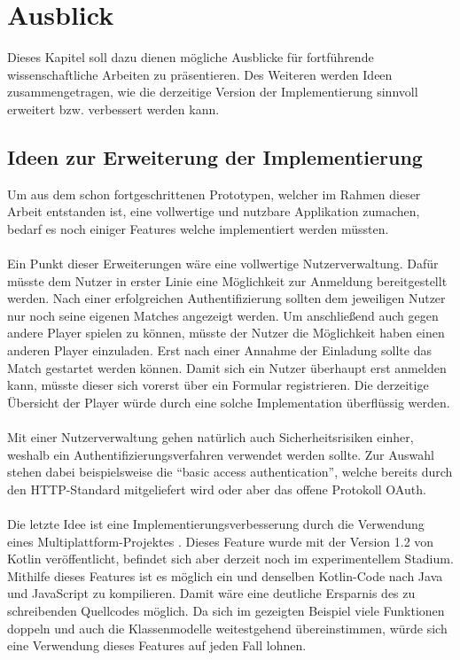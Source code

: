 
\chapter{Ausblick}\label{chap:outlook}
Dieses Kapitel soll dazu dienen mögliche Ausblicke für fortführende wissenschaftliche Arbeiten zu präsentieren. Des Weiteren werden Ideen zusammengetragen, wie die derzeitige Version der Implementierung sinnvoll erweitert bzw. verbessert werden kann.

\section{Ideen zur Erweiterung der Implementierung}
Um aus dem schon fortgeschrittenen Prototypen, welcher im Rahmen dieser Arbeit entstanden ist, eine vollwertige und nutzbare Applikation zumachen, bedarf es noch einiger Features welche implementiert werden müssten.\\
\\
Ein Punkt dieser Erweiterungen wäre eine vollwertige Nutzerverwaltung. Dafür müsste dem Nutzer in erster Linie eine Möglichkeit zur Anmeldung bereitgestellt werden. Nach einer erfolgreichen Authentifizierung sollten dem jeweiligen Nutzer nur noch seine eigenen Matches angezeigt werden.
Um anschließend auch gegen andere Player spielen zu können, müsste der Nutzer die Möglichkeit haben einen anderen Player einzuladen. Erst nach einer Annahme der Einladung sollte das Match gestartet werden können. Damit sich ein Nutzer überhaupt erst anmelden kann, müsste dieser sich vorerst über ein Formular registrieren. Die derzeitige Übersicht der Player würde durch eine solche Implementation überflüssig werden.\\
\\
Mit einer Nutzerverwaltung gehen natürlich auch Sicherheitsrisiken einher, weshalb ein Authentifizierungsverfahren verwendet werden sollte. Zur Auswahl stehen dabei beispielsweise die \enquote{basic access authentication}, welche bereits durch den \gls{HTTP}-Standard mitgeliefert wird oder aber das offene Protokoll \gls{OAuth}.\\
\\
Die letzte Idee ist eine Implementierungsverbesserung durch die Verwendung eines Multiplattform-Projektes \cite{kotlinMultiPlattform}. Dieses Feature wurde mit der Version 1.2 von Kotlin veröffentlicht, befindet sich aber derzeit noch im experimentellem Stadium. Mithilfe dieses Features ist es möglich ein und denselben Kotlin-Code nach Java und JavaScript zu kompilieren. Damit wäre eine deutliche Ersparnis des zu schreibenden Quellcodes möglich. Da sich im gezeigten Beispiel viele Funktionen doppeln und auch die Klassenmodelle weitestgehend übereinstimmen, würde sich eine Verwendung dieses Features auf jeden Fall lohnen.


